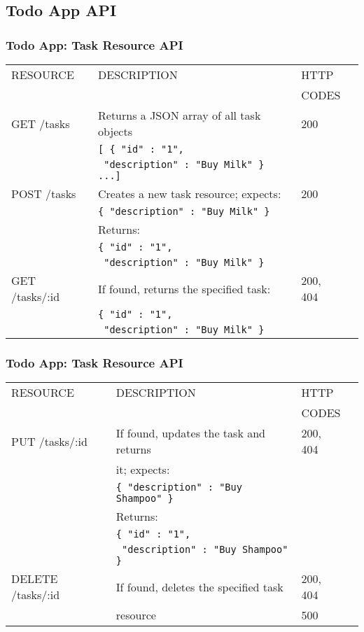 \documentclass{beamer}
\begin{document}
  
\subsection{Todo App API}
\begin{frame}[fragile]\frametitle{Todo App: Task Resource API} 

\begin{tabular}{|l|l|l|l|}
\hline 
RESOURCE & DESCRIPTION & HTTP \\
 & & CODES \\ 
\hline 
GET /tasks & Returns a JSON array of all task objects & 200 \\ 
 & {\small\texttt{[ \{ "id" : "1", }} & \\
 & {\small\texttt{    "description" : "Buy Milk" \} ...]}} & \\
\hline 
POST /tasks & Creates a new task resource; expects: & 200 \\
 & \small\texttt{\{ "description" : "Buy Milk" \}} & \\ 
 & Returns: & \\ 
 & {\small\texttt{\{ "id" : "1", }} & \\
 & {\small\texttt{    "description" : "Buy Milk" \}}} & \\
\hline 
GET /tasks/:id  & If found, returns the specified task: & 200, 404 \\ 
 & {\small\texttt{\{ "id" : "1", }} & \\
 & {\small\texttt{    "description" : "Buy Milk" \}}} & \\
\hline 
\end{tabular} 
  
\end{frame}




\begin{frame}[fragile]\frametitle{Todo App: Task Resource API} 

\begin{tabular}{|l|l|l|l|}
\hline 
RESOURCE & DESCRIPTION & HTTP \\
 & & CODES \\ 
\hline 
PUT /tasks/:id & If found, updates the task and returns & 200, 404 \\ 
 & it; expects: & \\
 & \small\texttt{\{ "description" : "Buy Shampoo" \}} & \\ 
 & Returns: & \\ 
 & {\small\texttt{\{ "id" : "1", }} & \\
 & {\small\texttt{    "description" : "Buy Shampoo" \}}} & \\
\hline 
DELETE /tasks/:id & If found, deletes the specified task & 200, 404 \\ 
 & resource & 500 \\ 
\hline 
\end{tabular} 
  
\end{frame}
\end{document}
